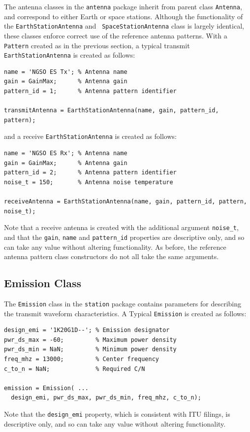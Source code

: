 \documentclass[11pt]{article}
\begin{document}
The antenna classes in the \texttt{\small antenna} package inherit
from parent class \texttt{\small Antenna}, and correspond to either
Earth or space stations. Although the functionality of the
\texttt{\small EarthStationAntenna} and \texttt{\small
  SpaceStationAntenna} class is largely identical, these classes
enforce correct use of the reference antenna patterns. With a
\texttt{\small Pattern} created as in the previous section, a typical
transmit \texttt{\small EarthStationAntenna} is created as follows:
{\small
\begin{verbatim}
name = 'NGSO ES Tx'; % Antenna name
gain = GainMax;      % Antenna gain
pattern_id = 1;      % Antenna pattern identifier

transmitAntenna = EarthStationAntenna(name, gain, pattern_id, pattern);
\end{verbatim}
}
and a receive \texttt{\small EarthStationAntenna} is created as
follows:
{\small
\begin{verbatim}
name = 'NGSO ES Rx'; % Antenna name
gain = GainMax;      % Antenna gain
pattern_id = 2;      % Antenna pattern identifier
noise_t = 150;       % Antenna noise temperature

receiveAntenna = EarthStationAntenna(name, gain, pattern_id, pattern, noise_t);
\end{verbatim}
}
\noindent Note that a receive antenna is created with the additional
argument \texttt{\small noise\_t}, and that the \texttt{\small gain},
\texttt{\small name} and \texttt{\small pattern\_id} properties are
descriptive only, and so can take any value without altering
functionality. As before, the reference antenna pattern class
constructors do not all take the same arguments.

\subsection{Emission Class}

The \texttt{\small Emission} class in the \texttt{\small station}
package contains parameters for describing the transmit waveform
characteristics. A Typical \texttt{\small Emission} is created as
follows:
{\small
\begin{verbatim}
design_emi = '1K20G1D--'; % Emission designator
pwr_ds_max = -60;         % Maximum power density
pwr_ds_min = NaN;         % Minimum power density
freq_mhz = 13000;         % Center frequency
c_to_n = NaN;             % Required C/N

emission = Emission( ...
  design_emi, pwr_ds_max, pwr_ds_min, freq_mhz, c_to_n);
\end{verbatim}
}
\noindent Note that the \texttt{\small design\_emi} property, which is
consistent with ITU filings, is descriptive only, and so can take any
value without altering functionality.
\end{document}

